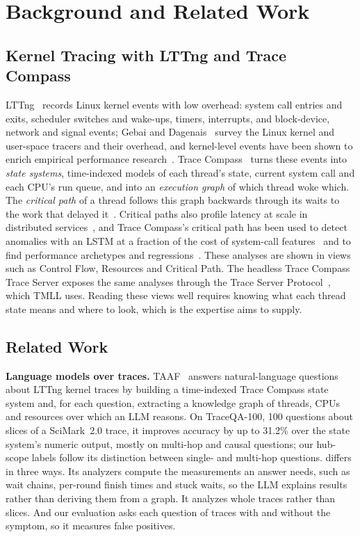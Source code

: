 \section{Background and Related Work}

\subsection{Kernel Tracing with LTTng and Trace Compass}

LTTng~\cite{desnoyers2006lttng} records Linux kernel events with low overhead: system call entries and exits, scheduler switches and wake-ups, timers, interrupts, and block-device, network and signal events; Gebai and Dagenais~\cite{gebai2018survey} survey the Linux kernel and user-space tracers and their overhead, and kernel-level events have been shown to enrich empirical performance research~\cite{noferesti2024kernel}. Trace Compass~\cite{tracecompass} turns these events into \emph{state systems}, time-indexed models of each thread's state, current system call and each CPU's run queue, and into an \emph{execution graph} of which thread woke which. The \emph{critical path} of a thread follows this graph backwards through its waits to the work that delayed it~\cite{giraldeau2016wait}. Critical paths also profile latency at scale in distributed services~\cite{eaton2022cpt,zhang2022crisp}, and Trace Compass's critical path has been used to detect anomalies with an LSTM at a fraction of the cost of system-call features~\cite{nourollahi2025tracelens} and to find performance archetypes and regressions~\cite{shahedi2026archetypes}. These analyses are shown in views such as Control Flow, Resources and Critical Path. The headless Trace Compass Trace Server exposes the same analyses through the Trace Server Protocol~\cite{tsp}, which TMLL uses. Reading these views well requires knowing what each thread state means and where to look, which is the expertise \sysname aims to supply.

\subsection{Related Work}

\textbf{Language models over traces.} TAAF~\cite{ezaz2026taaf} answers natural-language questions about LTTng kernel traces by building a time-indexed Trace Compass state system and, for each question, extracting a knowledge graph of threads, CPUs and resources over which an LLM reasons. On TraceQA-100, 100 questions about slices of a SciMark~2.0 trace, it improves accuracy by up to 31.2\% over the state system's numeric output, mostly on multi-hop and causal questions; our hub-scope labels follow its distinction between single- and multi-hop questions. \sysname differs in three ways. Its analyzers compute the measurements an answer needs, such as wait chains, per-round finish times and stuck waits, so the LLM explains results rather than deriving them from a graph. It analyzes whole traces rather than slices. And our evaluation asks each question of traces with and without the symptom, so it measures false positives.


